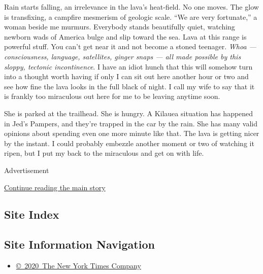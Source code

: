 Rain starts falling, an irrelevance in the lava's heat-field. No one
moves. The glow is transfixing, a campfire mesmerism of geologic scale.
``We are very fortunate,'' a woman beside me murmurs. Everybody stands
beautifully quiet, watching newborn wads of America bulge and slip
toward the sea. Lava at this range is powerful stuff. You can't get near
it and not become a stoned teenager. \emph{Whoa --- consciousness,
language, satellites, ginger snaps --- all made possible by this sloppy,
tectonic incontinence}. I have an idiot hunch that this will somehow
turn into a thought worth having if only I can sit out here another hour
or two and see how fine the lava looks in the full black of night. I
call my wife to say that it is frankly too miraculous out here for me to
be leaving anytime soon.

She is parked at the trailhead. She is hungry. A Kilauea situation has
happened in Jed's Pampers, and they're trapped in the car by the rain.
She has many valid opinions about spending even one more minute like
that. The lava is getting nicer by the instant. I could probably
embezzle another moment or two of watching it ripen, but I put my back
to the miraculous and get on with life.

Advertisement

\protect\hyperlink{after-bottom}{Continue reading the main story}

\hypertarget{site-index}{%
\subsection{Site Index}\label{site-index}}

\hypertarget{site-information-navigation}{%
\subsection{Site Information
Navigation}\label{site-information-navigation}}

\begin{itemize}
\tightlist
\item
  \href{https://help.nytimes3xbfgragh.onion/hc/en-us/articles/115014792127-Copyright-notice}{©~2020~The
  New York Times Company}
\end{itemize}

